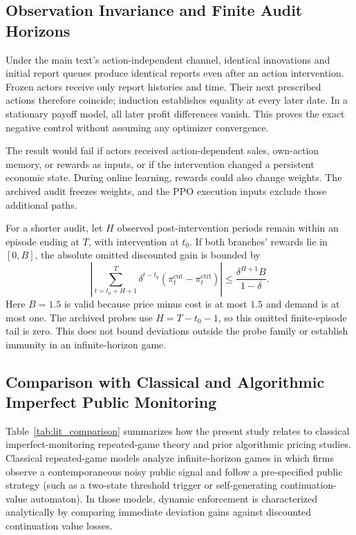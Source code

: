 \subsection{Observation Invariance and Finite Audit Horizons}

Under the main text's action-independent channel, identical innovations and initial report queues produce identical reports even after an action intervention. Frozen actors receive only report histories and time. Their next prescribed actions therefore coincide; induction establishes equality at every later date. In a stationary payoff model, all later profit differences vanish. This proves the exact negative control without assuming any optimizer convergence.

The result would fail if actors received action-dependent sales, own-action memory, or rewards as inputs, or if the intervention changed a persistent economic state. During online learning, rewards could also change weights. The archived audit freezes weights, and the PPO execution inputs exclude those additional paths.

For a shorter audit, let $H$ observed post-intervention periods remain within an episode ending at $T$, with intervention at $t_0$. If both branches' rewards lie in $[0, B]$, the absolute omitted discounted gain is bounded by
\[
\left| \sum_{t=t_0+H+1}^{T} \delta^{t-t_0} (\pi_t^{\mathrm{cut}} - \pi_t^{\mathrm{ctrl}}) \right| \leq \frac{\delta^{H+1} B}{1-\delta}.
\]
Here $B = 1.5$ is valid because price minus cost is at most $1.5$ and demand is at most one. The archived probes use $H = T - t_0 - 1$, so this omitted finite-episode tail is zero. This does not bound deviations outside the probe family or establish immunity in an infinite-horizon game.

\subsection{Comparison with Classical and Algorithmic Imperfect Public Monitoring}

Table~\ref{tab:lit_comparison} summarizes how the present study relates to classical imperfect-monitoring repeated-game theory and prior algorithmic pricing studies. Classical repeated-game models \citep{green1984noncooperative, abreu1990toward, fudenberg1994folk} analyze infinite-horizon games in which firms observe a contemporaneous noisy public signal and follow a pre-specified public strategy (such as a two-state threshold trigger or self-generating continuation-value automaton). In those models, dynamic enforcement is characterized analytically by comparing immediate deviation gains against discounted continuation value losses.

